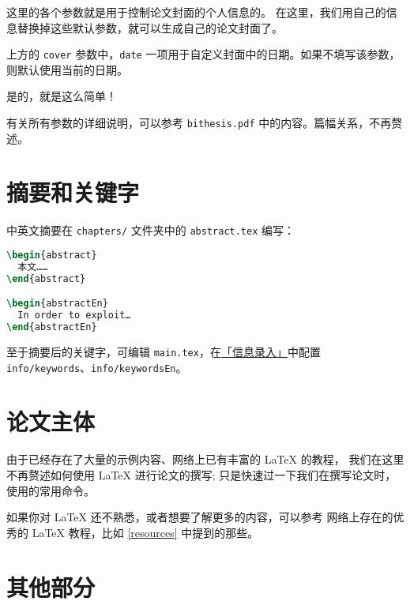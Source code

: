 这里的各个参数就是用于控制论文封面的个人信息的。
在这里，我们用自己的信息替换掉这些默认参数，就可以生成自己的论文封面了。

上方的 \texttt{cover} 参数中，\texttt{date} 一项用于自定义封面中的日期。如果不填写该参数，
则默认使用当前的日期。

是的，就是这么简单！

有关所有参数的详细说明，可以参考 \texttt{bithesis.pdf} 中的内容。篇幅关系，不再赘述。

\section{摘要和关键字}

中英文摘要在 \texttt{chapters/} 文件夹中的 \texttt{abstract.tex} 编写：

\begin{lstlisting}[language=TeX]
\begin{abstract}
  本文……
\end{abstract}

\begin{abstractEn}
  In order to exploit…
\end{abstractEn}
\end{lstlisting}

至于摘要后的关键字，可编辑 \texttt{main.tex}，在\hyperref[sec:BITSetup]{「信息录入」}中配置 \texttt{info/keywords}、\texttt{info/keywordsEn}。

\section{论文主体}

由于已经存在了大量的示例内容、网络上已有丰富的 \LaTeX{} 的教程，
我们在这里不再赘述如何使用 \LaTeX{} 进行论文的撰写;
只是快速过一下我们在撰写论文时，使用的常用命令。

如果你对 \LaTeX{} 还不熟悉，或者想要了解更多的内容，可以参考
网络上存在的优秀的 \LaTeX{} 教程，比如 \ref{resources} 中提到的那些。

\section{其他部分}

